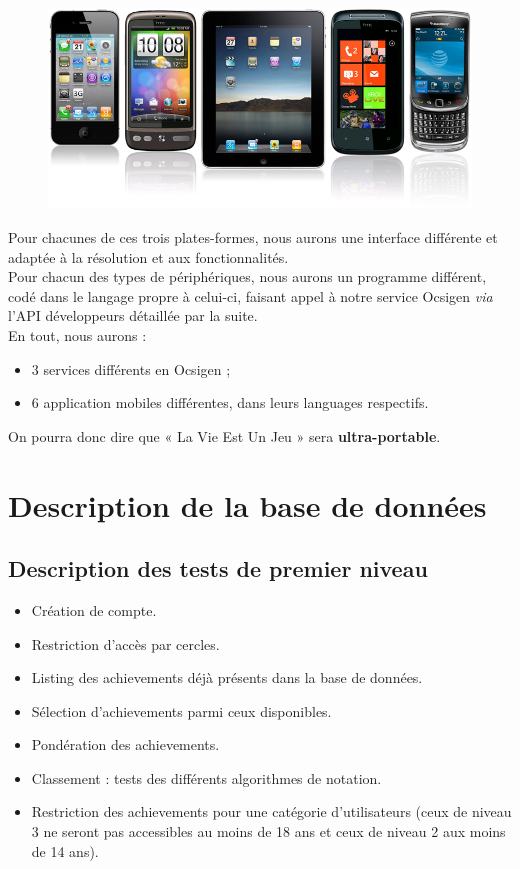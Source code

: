 \documentclass{life-fr}
\begin{document}
\begin{figure}[H]
  \begin{center}
    \includegraphics[width=13cm]{img/mobiles.jpg}
  \end{center}
\end{figure}

Pour chacunes de ces trois plates-formes, nous aurons une interface différente
et adaptée à la résolution et aux fonctionnalités.\\
Pour chacun des types de périphériques, nous aurons un programme différent,
codé dans le langage propre à celui-ci, faisant appel à notre service Ocsigen
\textit{via} l'API développeurs détaillée par la suite.\\
En tout, nous aurons :
\begin{itemize}
  \item 3 services différents en Ocsigen ;
  \item 6 application mobiles différentes, dans leurs languages respectifs.
\end{itemize}

On pourra donc dire que « La Vie Est Un Jeu » sera \textbf{ultra-portable}.


\chapter{Description de la base de données}

\section{Description des tests de premier niveau}

\begin{itemize}
  \item Création de compte.
  \item Restriction d’accès par cercles.
  \item Listing des achievements déjà présents dans la base de données.
  \item Sélection d’achievements parmi ceux disponibles.
  \item Pondération des achievements.
  \item Classement : tests des différents algorithmes de notation.
  \item Restriction des achievements pour une catégorie d’utilisateurs (ceux de niveau 3 ne seront pas accessibles au moins de 18 ans et ceux de niveau 2 aux moins de 14 ans).
\end{itemize}
\end{document}
